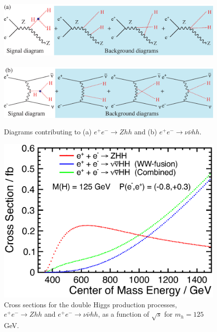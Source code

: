 
\begin{figure}[htb]
\centering
\includegraphics[width=130mm]{chapters/figures/zhhdiagrams.eps}
\\~\\
\includegraphics[width=130mm]{chapters/figures/vvhhdiagrams.eps}
\caption{Diagrams contributing to (a) $e^+e^- \to Zhh$ and (b) $e^+e^- \to \nu\bar{\nu}hh$.} 
\label{fig:hhdiagrams}
\end{figure}
\begin{figure}[htb]
\centering
\includegraphics[width=0.85\hsize]{chapters/figures/HHXSec_l.eps}
\caption{Cross sections for the double Higgs production processes, 
$e^+e^- \to Zhh$ and $e^+e^- \to \nu\bar{\nu}hh$, as a function of $\sqrt{s}$ for $m_h=125\,$GeV.} 
\label{fig:sigzhh_vvhh}
\end{figure}

